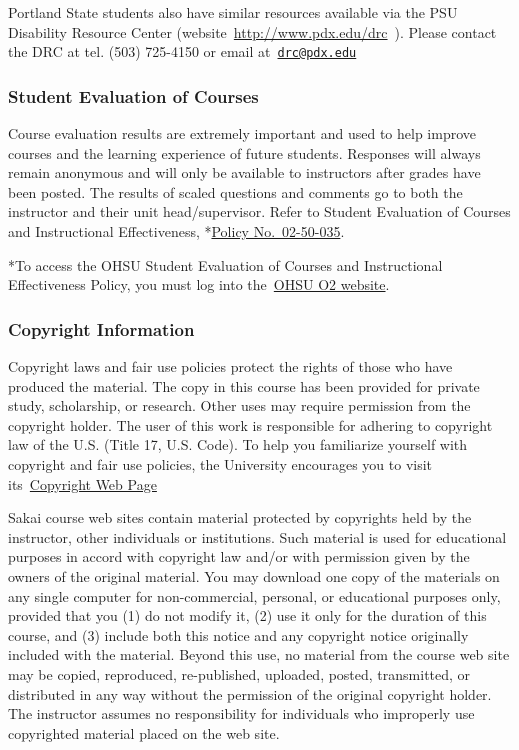 \documentclass[
  letterpaper,
  DIV=11,
  numbers=noendperiod]{scrartcl}
\begin{document}
Portland State students also have similar resources available via the
PSU Disability Resource Center (website~\url{http://www.pdx.edu/drc}~).
Please contact the DRC at tel. (503) 725-4150 or email
at~\href{mailto:drc@pdx.edu}{\nolinkurl{drc@pdx.edu}}

\hypertarget{student-evaluation-of-courses}{%
\subsubsection{Student Evaluation of
Courses}\label{student-evaluation-of-courses}}

Course evaluation results are extremely important and used to help
improve courses and the learning experience of future students.
Responses will always remain anonymous and will only be available to
instructors after grades have been posted. The results of scaled
questions and comments go to both the instructor and their unit
head/supervisor. Refer to Student Evaluation of Courses and
Instructional Effectiveness,
*\href{https://o2.ohsu.edu/policies-and-compliance/ohsu-policy-manual/chapter-2-student-affairs/ohsu-policy-02-50-035.cfm}{Policy
No.~02-50-035}.

*To access the OHSU Student Evaluation of Courses and Instructional
Effectiveness Policy, you must log into
the~\href{https://o2.ohsu.edu/}{OHSU O2 website}.

\hypertarget{copyright-information}{%
\subsubsection{Copyright Information}\label{copyright-information}}

Copyright laws and fair use policies protect the rights of those who
have produced the material. The copy in this course has been provided
for private study, scholarship, or research. Other uses may require
permission from the copyright holder. The user of this work is
responsible for adhering to copyright law of the U.S. (Title 17, U.S.
Code). To help you familiarize yourself with copyright and fair use
policies, the University encourages you to visit
its~\href{https://www.ohsu.edu/xd/education/library/services/copyright/}{Copyright
Web Page}

Sakai course web sites contain material protected by copyrights held by
the instructor, other individuals or institutions. Such material is used
for educational purposes in accord with copyright law and/or with
permission given by the owners of the original material. You may
download one copy of the materials on any single computer for
non-commercial, personal, or educational purposes only, provided that
you (1) do not modify it, (2) use it only for the duration of this
course, and (3) include both this notice and any copyright notice
originally included with the material. Beyond this use, no material from
the course web site may be copied, reproduced, re-published, uploaded,
posted, transmitted, or distributed in any way without the permission of
the original copyright holder. The instructor assumes no responsibility
for individuals who improperly use copyrighted material placed on the
web site.
\end{document}
